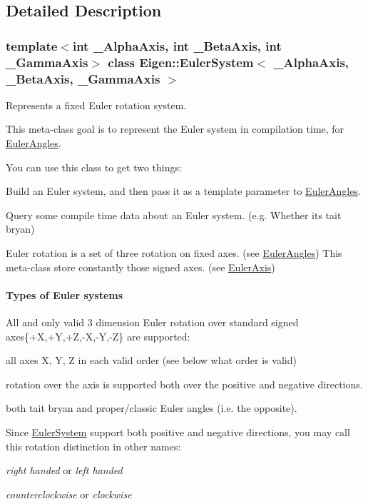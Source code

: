 \subsection{Detailed Description}
\subsubsection*{template$<$int \+\_\+\+Alpha\+Axis, int \+\_\+\+Beta\+Axis, int \+\_\+\+Gamma\+Axis$>$\newline
class Eigen\+::\+Euler\+System$<$ \+\_\+\+Alpha\+Axis, \+\_\+\+Beta\+Axis, \+\_\+\+Gamma\+Axis $>$}

Represents a fixed Euler rotation system. 

This meta-\/class goal is to represent the Euler system in compilation time, for \hyperlink{class_eigen_1_1_euler_angles}{Euler\+Angles}.

You can use this class to get two things\+:
\begin{DoxyItemize}
\item Build an Euler system, and then pass it as a template parameter to \hyperlink{class_eigen_1_1_euler_angles}{Euler\+Angles}.
\item Query some compile time data about an Euler system. (e.\+g. Whether it\textquotesingle{}s tait bryan)
\end{DoxyItemize}

Euler rotation is a set of three rotation on fixed axes. (see \hyperlink{class_euler_angles}{Euler\+Angles}) This meta-\/class store constantly those signed axes. (see \hyperlink{namespace_eigen_ae614aa7cdd687fb5c421a54f2ce5c361}{Euler\+Axis})

\paragraph*{Types of Euler systems}

All and only valid 3 dimension Euler rotation over standard signed axes\{+X,+Y,+Z,-\/X,-\/Y,-\/Z\} are supported\+:
\begin{DoxyItemize}
\item all axes X, Y, Z in each valid order (see below what order is valid)
\item rotation over the axis is supported both over the positive and negative directions.
\item both tait bryan and proper/classic Euler angles (i.\+e. the opposite).
\end{DoxyItemize}

Since \hyperlink{class_eigen_1_1_euler_system}{Euler\+System} support both positive and negative directions, you may call this rotation distinction in other names\+:
\begin{DoxyItemize}
\item {\itshape right handed} or {\itshape left handed}
\item {\itshape counterclockwise} or {\itshape clockwise}
\end{DoxyItemize}

